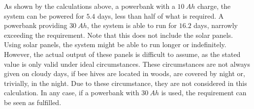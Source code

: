 As shown by the calculations above, a powerbank with a $10\ Ah$ charge, the system can be powered for $5.4$ days, less than half of what is required.
A powerbank providing $30\ Ah$, the system is able to run for $16.2$ days, narrowly exceeding the requirement.
Note that this does not include the solar panels.
Using solar panels, the system might be able to run longer or indefinitely.
However, the actual output of these panels is difficult to assume, as the stated value is only valid under ideal circumstances.
These circumstances are not always given on cloudy days, if bee hives are located in woods, are covered by night or, trivially, in the night.
Due to these circumstance, they are not considered in this calculation.
In any case, if a powerbank with $30\ Ah$ is used, the requirement can be seen as fulfilled.

